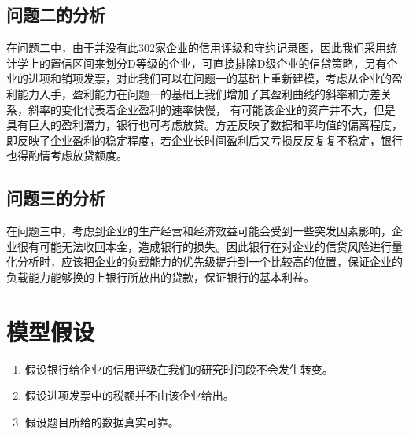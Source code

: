 \documentclass[dvipsnames,withoutpreface,bwprint]{cumcmthesis}
\begin{document}
\subsection{问题二的分析}
在问题二中，由于并没有此302家企业的信用评级和守约记录图，因此我们采用统计学上的置信区间来划分D等级的企业，可直接排除D级企业的信贷策略，另有企业的进项和销项发票，对此我们可以在问题一的基础上重新建模，考虑从企业的盈利能力入手，盈利能力在问题一的基础上我们增加了其盈利曲线的斜率和方差关系，斜率的变化代表着企业盈利的速率快慢，
有可能该企业的资产并不大，但是具有巨大的盈利潜力，银行也可考虑放贷。方差反映了数据和平均值的偏离程度，即反映了企业盈利的稳定程度，若企业长时间盈利后又亏损反反复复不稳定，银行也得酌情考虑放贷额度。
\subsection{问题三的分析}
在问题三中，考虑到企业的生产经营和经济效益可能会受到一些突发因素影响，企业很有可能无法收回本金，造成银行的损失。因此银行在对企业的信贷风险进行量化分析时，应该把企业的负载能力的优先级提升到一个比较高的位置，保证企业的负载能力能够换的上银行所放出的贷款，保证银行的基本利益。
\section{模型假设}
\begin{enumerate}
    \item 假设银行给企业的信用评级在我们的研究时间段不会发生转变。
    \item 假设进项发票中的税额并不由该企业给出。
    \item 假设题目所给的数据真实可靠。
\end{enumerate}
\end{document}

